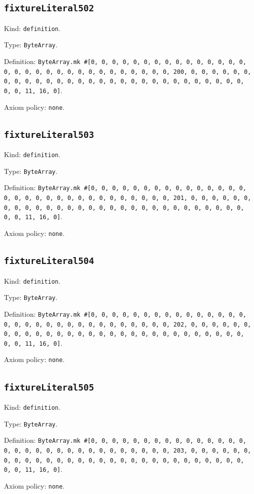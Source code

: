 \documentclass[11pt]{article}
\begin{document}
\subsection*{\texttt{fixtureLiteral502}}
\noindent Kind: \texttt{definition}.\par
\noindent Type: \texttt{ByteArray}.\par
\noindent Definition: \texttt{ByteArray.mk \#[0, 0, 0, 0, 0, 0, 0, 0, 0, 0, 0, 0, 0, 0, 0, 0, 0, 0, 0, 0, 0, 0, 0, 0, 0, 0, 0, 0, 0, 0, 0, 200, 0, 0, 0, 0, 0, 0, 0, 0, 0, 0, 0, 0, 0, 0, 0, 0, 0, 0, 0, 0, 0, 0, 0, 0, 0, 0, 0, 0, 0, 0, 0, 11, 16, 0]}.\par
\noindent Axiom policy: \texttt{none}.\par
\subsection*{\texttt{fixtureLiteral503}}
\noindent Kind: \texttt{definition}.\par
\noindent Type: \texttt{ByteArray}.\par
\noindent Definition: \texttt{ByteArray.mk \#[0, 0, 0, 0, 0, 0, 0, 0, 0, 0, 0, 0, 0, 0, 0, 0, 0, 0, 0, 0, 0, 0, 0, 0, 0, 0, 0, 0, 0, 0, 0, 201, 0, 0, 0, 0, 0, 0, 0, 0, 0, 0, 0, 0, 0, 0, 0, 0, 0, 0, 0, 0, 0, 0, 0, 0, 0, 0, 0, 0, 0, 0, 0, 11, 16, 0]}.\par
\noindent Axiom policy: \texttt{none}.\par
\subsection*{\texttt{fixtureLiteral504}}
\noindent Kind: \texttt{definition}.\par
\noindent Type: \texttt{ByteArray}.\par
\noindent Definition: \texttt{ByteArray.mk \#[0, 0, 0, 0, 0, 0, 0, 0, 0, 0, 0, 0, 0, 0, 0, 0, 0, 0, 0, 0, 0, 0, 0, 0, 0, 0, 0, 0, 0, 0, 0, 202, 0, 0, 0, 0, 0, 0, 0, 0, 0, 0, 0, 0, 0, 0, 0, 0, 0, 0, 0, 0, 0, 0, 0, 0, 0, 0, 0, 0, 0, 0, 0, 11, 16, 0]}.\par
\noindent Axiom policy: \texttt{none}.\par
\subsection*{\texttt{fixtureLiteral505}}
\noindent Kind: \texttt{definition}.\par
\noindent Type: \texttt{ByteArray}.\par
\noindent Definition: \texttt{ByteArray.mk \#[0, 0, 0, 0, 0, 0, 0, 0, 0, 0, 0, 0, 0, 0, 0, 0, 0, 0, 0, 0, 0, 0, 0, 0, 0, 0, 0, 0, 0, 0, 0, 203, 0, 0, 0, 0, 0, 0, 0, 0, 0, 0, 0, 0, 0, 0, 0, 0, 0, 0, 0, 0, 0, 0, 0, 0, 0, 0, 0, 0, 0, 0, 0, 11, 16, 0]}.\par
\noindent Axiom policy: \texttt{none}.\par
\end{document}
